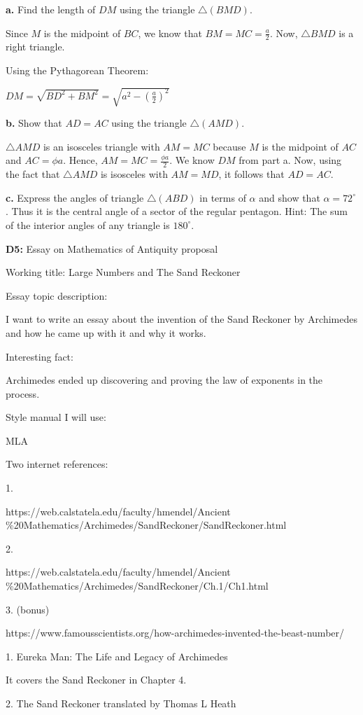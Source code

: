 \documentclass{article}
\begin{document}
\textbf{a.} Find the length of $DM$ using the triangle $\triangle (BMD)$.

Since $M$ is the midpoint of $BC$, we know that $BM = MC = \frac{a}{2}$.
Now, $\triangle BMD$ is a right triangle.

Using the Pythagorean Theorem:

$DM = \sqrt{BD^2 + BM^2} = \sqrt{a^2 - \left(\frac{a}{2}\right)^2}$

\textbf{b.} Show that $AD = AC$ using the triangle $\triangle (AMD)$.

$\triangle AMD$ is an isosceles triangle with $AM = MC$ because $M$ is the
midpoint of $AC$ and $AC = \phi a$. Hence, $AM = MC = \frac{\phi a}{2}$.
We know $DM$ from part a. Now, using the fact that $\triangle AMD$ is isosceles
with $AM = MD$, it follows that $AD = AC$.

\textbf{c.} Express the angles of triangle $\triangle (ABD)$ in
terms of $\alpha$ and show that $\alpha = 72^{\circ}$. Thus
it is the central angle of a sector of the regular pentagon.
Hint: The sum of the interior angles of any triangle is $180^{\circ}$.

\newpage

\textbf{D5:} Essay on Mathematics of Antiquity proposal

Working title: Large Numbers and The Sand Reckoner

Essay topic description:

I want to write an essay about the invention of the Sand Reckoner
by Archimedes and how he came up with it and why it works.

Interesting fact:

Archimedes ended up discovering and proving the law of exponents in the process.

Style manual I will use:

MLA

Two internet references:

1.

https://web.calstatela.edu/faculty/hmendel/Ancient
\%20Mathematics/Archimedes/SandReckoner/SandReckoner.html

2.

https://web.calstatela.edu/faculty/hmendel/Ancient
\%20Mathematics/Archimedes/SandReckoner/Ch.1/Ch1.html

3. (bonus)

https://www.famousscientists.org/how-archimedes-invented-the-beast-number/

1. Eureka Man: The Life and Legacy of Archimedes

It covers the Sand Reckoner in Chapter 4.

2. The Sand Reckoner translated by Thomas L Heath
\end{document}

